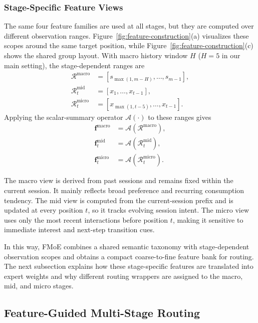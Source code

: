 \documentclass[sigconf,authordraft]{acmart}
\begin{document}
\subsubsection{Stage-Specific Feature Views}

The same four feature families are used at all stages, but they are computed over different observation ranges. Figure~\ref{fig:feature-construction}(a) visualizes these scopes around the same target position, while Figure~\ref{fig:feature-construction}(c) shows the shared group layout. With macro history window $H$ ($H=5$ in our main setting), the stage-dependent ranges are
\begin{align}
\mathcal{R}^{\mathrm{macro}} &= [s_{\max(1,m-H)}, \dots, s_{m-1}], \\
\mathcal{R}^{\mathrm{mid}}_t &= [x_1, \dots, x_{t-1}], \\
\mathcal{R}^{\mathrm{micro}}_t &= [x_{\max(1,t-5)}, \dots, x_{t-1}].
\end{align}
Applying the scalar-summary operator $\mathcal{A}(\cdot)$ to these ranges gives
\begin{align}
\mathbf{f}^{\mathrm{macro}} &= \mathcal{A}(\mathcal{R}^{\mathrm{macro}}), \\
\mathbf{f}^{\mathrm{mid}}_t &= \mathcal{A}(\mathcal{R}^{\mathrm{mid}}_t), \\
\mathbf{f}^{\mathrm{micro}}_t &= \mathcal{A}(\mathcal{R}^{\mathrm{micro}}_t).
\end{align}

The macro view is derived from past sessions and remains fixed within the current session. It mainly reflects broad preference and recurring consumption tendency. The mid view is computed from the current-session prefix and is updated at every position $t$, so it tracks evolving session intent. The micro view uses only the most recent interactions before position $t$, making it sensitive to immediate interest and next-step transition cues.

In this way, FMoE combines a shared semantic taxonomy with stage-dependent observation scopes and obtains a compact coarse-to-fine feature bank for routing. The next subsection explains how these stage-specific features are translated into expert weights and why different routing wrappers are assigned to the macro, mid, and micro stages.
\subsection{Feature-Guided Multi-Stage Routing}
\end{document}
